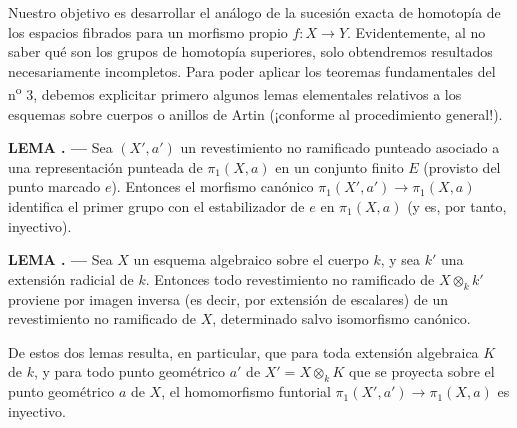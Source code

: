 \documentclass[11pt,twoside,openany]{book}
\numberwithin{equation}{section}
\newcommand{\src}[1]{%
  \phantomsection\hypertarget{src:#1}{}%
  \marginpar{\raggedleft\footnotesize\sffamily #1}%
}
\theoremstyle{plain}
\theoremstyle{definition}
\theoremstyle{remark}
\newcommand{\result}[2]{%
  \par\medskip\noindent\textbf{#1%
  \if\relax\detokenize{#2}\relax\else\space#2\fi. ---}\enspace
}
\newcommand{\FgaUnitKey}{frontmatter}
\renewcommand{\src}[1]{%
  \phantomsection\hypertarget{src:\FgaUnitKey:#1}{}%
  \marginpar{\raggedleft\footnotesize\sffamily #1}%
}
\theoremstyle{plain}
\theoremstyle{definition}
\theoremstyle{remark}
\begin{document}
\src{211}
Nuestro objetivo es desarrollar el análogo de la sucesión exacta de homotopía
de los espacios fibrados para un morfismo propio $f:X\longrightarrow Y$.
Evidentemente, al no saber qué son los grupos de homotopía superiores, solo
obtendremos resultados necesariamente incompletos. Para poder aplicar los
teoremas fundamentales del n\textsuperscript{o} 3, debemos explicitar primero
algunos lemas elementales relativos a los esquemas sobre cuerpos o anillos de
Artin (¡conforme al procedimiento general!).

\result{LEMA}{1} Sea $(X',a')$ un revestimiento no ramificado punteado asociado
a una representación punteada de $\pi_1(X,a)$ en un conjunto finito $E$
(provisto del punto marcado $e$). Entonces el morfismo canónico
$\pi_1(X',a')\longrightarrow\pi_1(X,a)$ identifica el primer grupo con el
estabilizador de $e$ en $\pi_1(X,a)$ (y es, por tanto, inyectivo).

\result{LEMA}{2} Sea $X$ un esquema algebraico sobre el cuerpo $k$, y sea $k'$
una extensión radicial de $k$. Entonces todo revestimiento no ramificado de
$X\otimes_k k'$ proviene por imagen inversa (es decir, por extensión de
escalares) de un revestimiento no ramificado de $X$, determinado salvo
isomorfismo canónico.

De estos dos lemas resulta, en particular, que para toda extensión algebraica
$K$ de $k$, y para todo punto geométrico $a'$ de $X'=X\otimes_k K$ que se
proyecta sobre el punto geométrico $a$ de $X$, el homomorfismo funtorial
$\pi_1(X',a')\longrightarrow\pi_1(X,a)$ es inyectivo.
\end{document}
